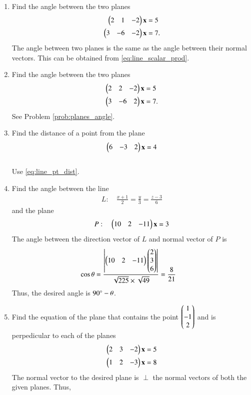 \begin{enumerate}[label=\arabic*.,ref=\thesubsection.\theenumi]
\item Find the angle between the two planes
\label{prob:planes_angle}
\begin{align}
\begin{pmatrix}2 & 1 & -2\end{pmatrix}\mathbf{x}&=5
\\
\begin{pmatrix}3 &-6 & -2\end{pmatrix}\mathbf{x}&=7.
\end{align}
%
\solution The angle between two planes is the same as the angle between their normal vectors.  This can be obtained from \eqref{eq:line_scalar_prod}.

\item Find the angle between the two planes
\begin{align}
\begin{pmatrix}2 & 2 & -2\end{pmatrix}\mathbf{x}&=5
\\
\begin{pmatrix}3 &-6 & 2\end{pmatrix}\mathbf{x}&=7.
\end{align}
%
\solution See Problem \eqref{prob:planes_angle}.
%
\item Find the distance of a point  from the plane
\begin{align}
\begin{pmatrix}6 & -3 & 2\end{pmatrix}\mathbf{x}=4
\end{align}
%
\\
\solution Use \eqref{eq:line_pt_dist}.
\item Find the angle between the line 
%
\begin{align}
L: \quad \frac{x+1}{2} = \frac{y}{3} = \frac{z-3}{6} 
\end{align}
%
and
%
the plane 
\begin{align}
P: \quad \begin{pmatrix}10 & 2 & -11\end{pmatrix}\mathbf{x}=3
\end{align}
%
\label{prob:plane_angle_line}
%
\solution The angle between the direction vector of $L$ and normal vector of $P$ is 
%
\begin{align}
\cos \theta &= \frac{\left\vert\begin{pmatrix}10 & 2 & -11\end{pmatrix}\begin{pmatrix}2\\3\\6\end{pmatrix}\right\vert}{\sqrt{225}\times \sqrt{49}} = \frac{8}{21}
\end{align}
%
Thus, the desired angle is $90\degree -\theta$.
\item Find the equation of the plane that contains the point $\begin{pmatrix}1\\-1\\2\end{pmatrix}$ and is perpedicular to each of the planes
\begin{align}
\begin{pmatrix}2 & 3 & -2\end{pmatrix}\mathbf{x}&=5
\\
\begin{pmatrix}1 & 2 & -3\end{pmatrix}\mathbf{x}&=8
\end{align}
%
\solution The normal vector to the desired plane is $\perp$ the normal vectors of both the given planes.  Thus,

\end{enumerate}

